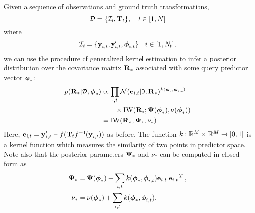 Given a sequence of observations and ground truth transformations,
\begin{equation}
\mathcal{D}=\{\mathcal{I}_t,\boldsymbol{\mathbf{T}}_t\},\quad t\in[1,N]
\end{equation} 
where
\begin{equation}
 \mathcal{I}_t = \{\boldsymbol{\mathbf{y}}_{i,t},
\boldsymbol{\mathbf{y}}_{i,t}', \boldsymbol{\mathbf{\phi}}_{i,t} \} \quad i\in[1,N_t],
\end{equation}
we can use the procedure of generalized kernel estimation
\citep{vega-brown2014nonparametric} to infer a posterior distribution over the
covariance matrix $\boldsymbol{\mathbf{R}}_*$ associated with some query
predictor vector $\boldsymbol{\mathbf{\phi}}_*$:
\begin{align}
  p(\boldsymbol{\mathbf{R}}_*|\mathcal{D}, \boldsymbol{\mathbf{\phi}}_*) &\propto
    \prod_{i,t}\mathcal{N}(\boldsymbol{\mathbf{e}}_{i,t} \vert \boldsymbol{\mathbf{0}},
      \boldsymbol{\mathbf{R}}_*)^{k(\boldsymbol{\mathbf{\phi}}_*,\boldsymbol{\mathbf{\phi}}_{i,t})} \nonumber
      \\
      &\qquad\times\text{IW}(\boldsymbol{\mathbf{R}}_*;\boldsymbol{\mathbf{\Psi}}(\boldsymbol{\mathbf{\phi}}_*),
      \nu(\boldsymbol{\mathbf{\phi}}_*)) \\
      &=\text{IW}(\boldsymbol{\mathbf{R}}_*;\boldsymbol{\mathbf{\Psi}}_*, \nu_*). 
\end{align}
Here, $\boldsymbol{\mathbf{e}}_{i,t}= \boldsymbol{\mathbf{y}}_{i,t}' - f(
\boldsymbol{\mathbf{T}}_t f^{-1}( \boldsymbol{\mathbf{y}}_{i,t} ))$ as before.  
The function $k: \RealNumbers[M]\times\RealNumbers[M]\to[0,1]$ is a kernel
function which measures the similarity of two points in predictor space.
Note also that the posterior parameters $\boldsymbol{\mathbf{\Psi}}_*$ and $\nu_*$ can be
computed in closed form as
\begin{align}
  \boldsymbol{\mathbf{\Psi}}_* &= \boldsymbol{\mathbf{\Psi}}(\boldsymbol{\mathbf{\phi}}_*) + 
    \sum_{i,t} k(\boldsymbol{\mathbf{\phi}}_*,\boldsymbol{\mathbf{\phi}}_{i,t}) 
    \boldsymbol{\mathbf{e}}_{i,t}\left.{\boldsymbol{\mathbf{e}}_{i,t}}\right.^T, \label{eq:compute-psi}\\
  \nu_* &= \nu(\boldsymbol{\mathbf{\phi}}_*) + \sum_{i,t}
    k(\boldsymbol{\mathbf{\phi}}_*,\boldsymbol{\mathbf{\phi}}_{i,t}).  \label{eq:compute-nu}
\end{align}

